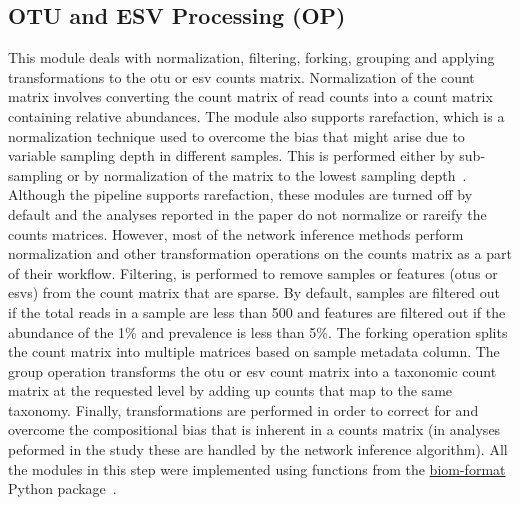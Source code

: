   \subsection*{OTU and ESV Processing (OP)}
  \vspace{-5mm}
  This module deals with normalization, filtering, forking, grouping and applying transformations to the \ac{otu} or \ac{esv} counts matrix.
  Normalization of the count matrix involves converting the count matrix of read counts into a count matrix containing relative abundances.
  The module also supports rarefaction, which is a normalization technique used to overcome the bias that might arise due to variable sampling depth in different samples.
  This is performed either by sub-sampling or by normalization of the matrix to the lowest sampling depth~\cite{Weiss2015}.
  Although the pipeline supports rarefaction, these modules are turned off by default and the analyses reported in the paper do not normalize or rareify the counts matrices.
  However, most of the network inference methods perform normalization and other transformation operations on the counts matrix as a part of their workflow.
  Filtering, is performed to remove samples or features (\ac{otu}s or \ac{esv}s) from the count matrix that are sparse.
  By default, samples are filtered out if the total reads in a sample are less than 500 and features are filtered out if the abundance of the 1\% and prevalence is less than 5\%.
  The forking operation splits the count matrix into multiple matrices based on sample metadata column.
  The group operation transforms the \ac{otu} or \ac{esv} count matrix into a taxonomic count matrix at the requested level by adding up counts that map to the same taxonomy.
  Finally, transformations are performed in order to correct for and overcome the compositional bias that is inherent in a counts matrix (in analyses peformed in the study these are handled by the network inference algorithm).
  All the modules in this step were implemented using functions from the \href{http://biom-format.org/}{biom-format} Python package~\cite{mcdonaldBiologicalObservationMatrix2012}.

